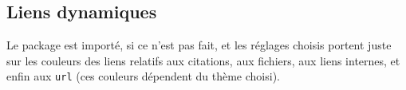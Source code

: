 \documentclass{main}
\begin{document}
\subsection{Liens dynamiques}

Le package  est importé, si ce n'est pas fait, et les réglages choisis portent juste sur les couleurs des liens relatifs aux citations, aux fichiers, aux liens internes, et enfin aux \verb#url# (ces couleurs dépendent du thème choisi).
\end{document}
